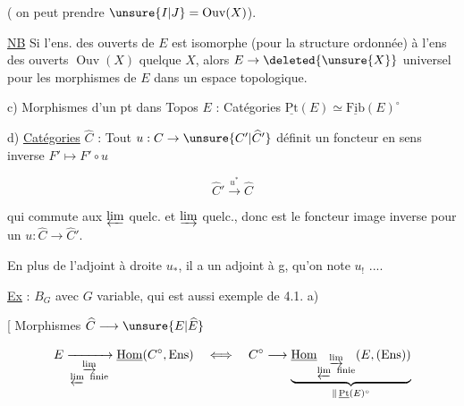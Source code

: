 ( on peut prendre $\unsure{I|J}=\operatorname{Ouv}(X)$).

 \uline{NB} Si l'ens. des ouverts de $E$ est  isomorphe (pour la structure ordonnée) à l'ens des ouverts $\operatorname{Ouv}(X)$ quelque $X$, alors $E\to\deleted{\unsure{X}}$    universel pour les morphismes de $E$ dans un espace topologique.


c) Morphismes d'un pt dans Topos $E$ : Catégories $\underline{\mathrm{Pt}}(E)\simeq\underline{\mathrm{Fib}}(E)^\circ$

d) \uline{Catégories} $\widehat C$ : Tout   $u:C\to\unsure{C'|\widehat C'}$ définit un foncteur  en sens inverse  $F'\mapsto F'\circ u$

\[\widehat C'\xrightarrow{u^*}\widehat C\]

 qui commute   aux $\varprojlim$ quelc. et  $\varinjlim$ quelc., donc est le foncteur image inverse pour un $u:\widehat C\longrightarrow\widehat C'$. 


En plus de l'adjoint à droite $u_*$, il a un adjoint à g, qu'on note $u_!$ ....

\uline{Ex} : $B_G$ avec $G$ variable, qui est aussi exemple de 4.1. a)

 [ Morphismes  $\widehat C\longrightarrow\unsure{E|\widehat E}$

\[E\xrightarrow[\substack{\varinjlim\\\varprojlim\ \mathrm{finie}}]{}\underline{\mathrm{Hom}}(C^\circ,\mathrm{Ens})\quad\Longleftrightarrow\quad C^\circ\longrightarrow\underbrace{\underline{\mathrm{Hom}}_{\substack{\varinjlim\\\varprojlim\ \mathrm{finie}}}(E,(\mathrm{Ens}))}_{\parallel\,\underline{\mathrm{Pt}}(E)^\circ}\]

